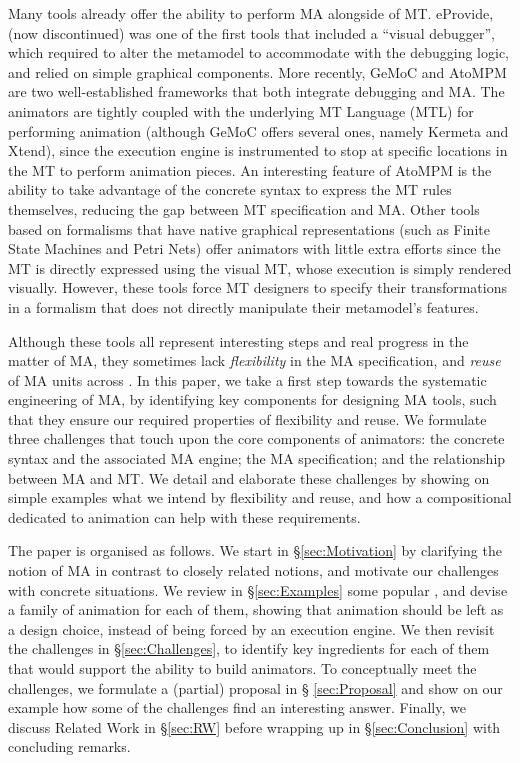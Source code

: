 Many \DSL tools already offer the ability to perform MA alongside of MT. eProvide,
\citep{Sadilek-Wachsmuth:2008} (now discontinued) was one of the first tools that
included a ``visual debugger'', which required to alter the \DSL metamodel to 
accommodate with the debugging logic, and relied on simple graphical components.
More recently, GeMoC \citep{combemale2016tool} and AtoMPM \cite{Syriani-Vangheluwe-etAl:2013}
are two well-established \DSL frameworks that both integrate debugging and MA. 
The animators are tightly coupled with the underlying MT Language (MTL) for 
performing animation (although GeMoC offers several ones, namely Kermeta and Xtend), since the
execution engine is instrumented to stop at specific locations in the MT to perform
animation pieces. An interesting feature of AtoMPM is the ability to take advantage
of the concrete syntax to express the MT rules themselves, reducing the gap between
MT specification and MA. Other tools based on formalisms that have native graphical
representations (such as Finite State Machines and Petri Nets) offer animators
with little extra efforts since the MT is directly expressed using the visual MT,
whose execution is simply rendered visually. However, these tools force MT designers to 
specify their transformations in a formalism that does not directly manipulate their
metamodel's features. 

Although these tools all represent interesting steps and real progress in the matter
of MA, they sometimes lack \emph{flexibility} in the MA specification, and 
\emph{reuse} of MA units across \DSLs. 
In this paper, we take a first step towards the systematic engineering of MA, by
identifying key components for designing MA tools, such that they ensure our
required properties of flexibility and reuse. We formulate three challenges that
touch upon the core components of animators: the concrete syntax and the associated
MA engine; the MA specification; and the relationship between MA and MT.
We detail and elaborate these challenges by showing on simple examples what we
intend by flexibility and reuse, and how a compositional \DSL dedicated to animation
can help with these requirements. 

The paper is organised as follows. We start in \S \ref{sec:Motivation} by clarifying
the notion of MA in contrast to closely related notions, and motivate our challenges
with concrete situations. We review in \S \ref{sec:Examples} some popular \DSLs,
and devise a family of animation for each of them, showing that animation should
be left as a design choice, instead of being forced by an execution engine. 
We then revisit the challenges in \S \ref{sec:Challenges}, to identify key 
ingredients for each of them that would support the ability to build animators.
To conceptually meet the challenges, we formulate a (partial) proposal in \S 
\ref{sec:Proposal} and show on our example \DSLs how some of the challenges find
an interesting answer. Finally, we discuss Related Work in \S \ref{sec:RW} before
wrapping up in \S \ref{sec:Conclusion} with concluding remarks.
